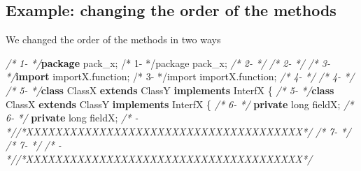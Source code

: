 \documentclass[
]{article}
\newenvironment{Shaded}{\begin{snugshade}}{\end{snugshade}}
\newcommand{\CommentTok}[1]{\textcolor[rgb]{0.56,0.35,0.01}{\textit{#1}}}
\newcommand{\DataTypeTok}[1]{\textcolor[rgb]{0.13,0.29,0.53}{#1}}
\newcommand{\ImportTok}[1]{#1}
\newcommand{\KeywordTok}[1]{\textcolor[rgb]{0.13,0.29,0.53}{\textbf{#1}}}
\newcommand{\NormalTok}[1]{#1}
\begin{document}
\begin{landscape}

\subsection{Example: changing the order of the methods} \label{example_editing_line}

We changed the order of the methods in two ways

\small

\normalsize

\scriptsize

\begin{Shaded}
\begin{Highlighting}[]
\CommentTok{/*  1-                 */}\KeywordTok{package}\ImportTok{ pack_x;                                                /*  1-                 */package pack_x;}                                                
\CommentTok{/*  2-                 */}                                                               \CommentTok{/*  2-                 */}                                                               
\CommentTok{/*  3-                 */}\KeywordTok{import}\ImportTok{ importX.function;                                       /*  3-                 */import importX.function;}                                       
\CommentTok{/*  4-                 */}                                                               \CommentTok{/*  4-                 */}                                                               
\CommentTok{/*  5-                 */}\KeywordTok{class}\NormalTok{ ClassX }\KeywordTok{extends}\NormalTok{ ClassY }\KeywordTok{implements}\NormalTok{ InterfX \{               }\CommentTok{/*  5-                 */}\KeywordTok{class}\NormalTok{ ClassX }\KeywordTok{extends}\NormalTok{ ClassY }\KeywordTok{implements}\NormalTok{ InterfX \{               }
\CommentTok{/*  6-                 */}    \KeywordTok{private} \DataTypeTok{long}\NormalTok{ fieldX;                                       }\CommentTok{/*  6-                 */}    \KeywordTok{private} \DataTypeTok{long}\NormalTok{ fieldX;                                       }
\CommentTok{/*   -                 *//*XXXXXXXXXXXXXXXXXXXXXXXXXXXXXXXXXXXXXX*/}                     \CommentTok{/*  7-                 */}                                                               
\CommentTok{/*  7-                 */}                                                               \CommentTok{/*   -                 *//*XXXXXXXXXXXXXXXXXXXXXXXXXXXXXXXXXXXXXX*/}                     

\end{Highlighting}
\end{Shaded}
\end{landscape}
\end{document}
